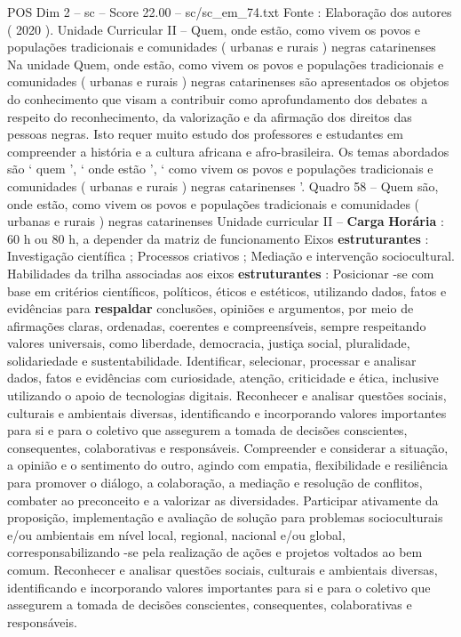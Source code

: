 \begin{textsample}{POS Dim 2 – sc – Score 22.00 – sc/sc\_em\_74.txt}
Fonte : Elaboração dos autores ( 2020 ).
Unidade Curricular II – Quem, onde estão, como vivem os povos e populações tradicionais e comunidades ( urbanas e rurais ) negras catarinenses Na unidade Quem, onde estão, como vivem os povos e populações tradicionais e comunidades ( urbanas e rurais ) negras catarinenses são apresentados os objetos do conhecimento que visam a contribuir como aprofundamento dos debates a respeito do reconhecimento, da valorização e da afirmação dos direitos das pessoas negras.
Isto requer muito estudo dos professores e estudantes em compreender a história e a cultura africana e afro-brasileira.
Os temas abordados são ‘ quem ’, ‘ onde estão ’, ‘ como vivem os povos e populações tradicionais e comunidades ( urbanas e rurais ) negras catarinenses ’.
Quadro 58 – Quem são, onde estão, como vivem os povos e populações tradicionais e comunidades ( urbanas e rurais ) negras catarinenses Unidade curricular II – \textbf{Carga} \textbf{Horária} : 60 h ou 80 h, a depender da matriz de funcionamento Eixos \textbf{estruturantes} : Investigação científica ; Processos criativos ; Mediação e intervenção sociocultural.
Habilidades da trilha associadas aos eixos \textbf{estruturantes} : Posicionar -se com base em critérios científicos, políticos, éticos e estéticos, utilizando dados, fatos e evidências para \textbf{respaldar} conclusões, opiniões e argumentos, por meio de afirmações claras, ordenadas, coerentes e compreensíveis, sempre respeitando valores universais, como liberdade, democracia, justiça social, pluralidade, solidariedade e sustentabilidade.
Identificar, selecionar, processar e analisar dados, fatos e evidências com curiosidade, atenção, criticidade e ética, inclusive utilizando o apoio de tecnologias digitais.
Reconhecer e analisar questões sociais, culturais e ambientais diversas, identificando e incorporando valores importantes para si e para o coletivo que assegurem a tomada de decisões conscientes, consequentes, colaborativas e responsáveis.
Compreender e considerar a situação, a opinião e o sentimento do outro, agindo com empatia, flexibilidade e resiliência para promover o diálogo, a colaboração, a mediação e resolução de conflitos, combater ao preconceito e a valorizar as diversidades.
Participar ativamente da proposição, implementação e avaliação de solução para problemas socioculturais e/ou ambientais em nível local, regional, nacional e/ou global, corresponsabilizando -se pela realização de ações e projetos voltados ao bem comum.
Reconhecer e analisar questões sociais, culturais e ambientais diversas, identificando e incorporando valores importantes para si e para o coletivo que assegurem a tomada de decisões conscientes, consequentes, colaborativas e responsáveis.

\end{textsample}

